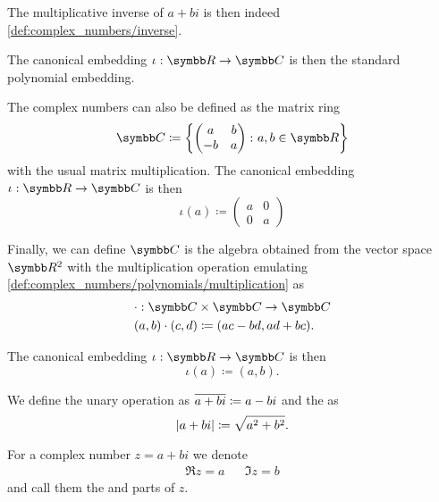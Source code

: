 \begin{definition}
\begin{defenum}
    The multiplicative inverse of \( a + bi \) is then indeed \cref{def:complex_numbers/inverse}.

    The canonical embedding \( \iota: \BR \to \BC \) is then the standard polynomial embedding.

     The complex numbers can also be defined as the matrix ring
    \begin{equation*}
      \BC \coloneqq \left\{
        \begin{pmatrix}
          a & b \\
          -b & a
        \end{pmatrix}
      \colon a, b \in \BR \right\}
    \end{equation*}
    with the usual matrix multiplication. The canonical embedding \( \iota: \BR \to \BC \) is then
    \begin{equation*}
      \iota(a) \coloneqq \begin{pmatrix}
        a & 0 \\
        0 & a
      \end{pmatrix}
    \end{equation*}

     Finally, we can define \( \BC \) is the algebra obtained from the vector space \( \BR^2 \) with the multiplication operation emulating \cref{def:complex_numbers/polynomials/multiplication} as
    \begin{align*}
      &\cdot: \BC \times \BC \to \BC \\
      &(a, b) \cdot (c, d) \coloneqq (ac - bd, ad + bc).
    \end{align*}

    The canonical embedding \( \iota: \BR \to \BC \) is then
    \begin{equation*}
      \iota(a) \coloneqq (a, b).
    \end{equation*}
  \end{defenum}

  We define the unary  operation as \( \overline{a + bi} \coloneqq a - bi \) and the  as
  \begin{equation*}
    \left\vert a + bi \right\vert \coloneqq \sqrt{a^2 + b^2}.
  \end{equation*}

  For a complex number \( z = a + bi \) we denote
  \begin{align*}
    \Re z = a && \Im z = b
  \end{align*}
  and call them the  and  parts of \( z \).
\end{definition}


